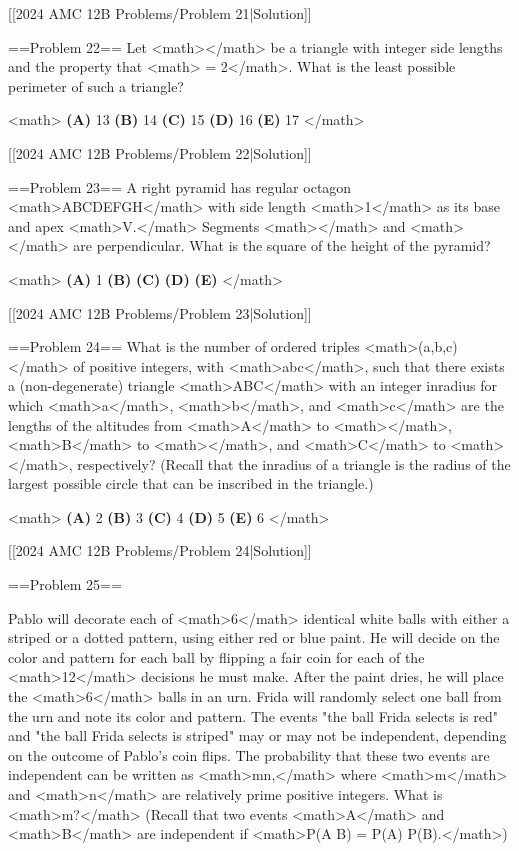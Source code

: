 [[2024 AMC 12B Problems/Problem 21|Solution]]

==Problem 22==
Let <math></math> be a triangle with integer side lengths and the property that <math> = 2</math>. What is the least possible perimeter of such a triangle?

<math>
\textbf{(A) }13 \qquad
\textbf{(B) }14 \qquad
\textbf{(C) }15 \qquad
\textbf{(D) }16 \qquad
\textbf{(E) }17 \qquad
</math>

[[2024 AMC 12B Problems/Problem 22|Solution]]

==Problem 23==
A right pyramid has regular octagon <math>ABCDEFGH</math> with side length <math>1</math> as its base and apex <math>V.</math> Segments <math></math> and <math></math> are perpendicular. What is the square of the height of the pyramid?

<math>
\textbf{(A) }1 \qquad
\textbf{(B) } \qquad
\textbf{(C) } \qquad
\textbf{(D) } \qquad
\textbf{(E) } \qquad
</math>

[[2024 AMC 12B Problems/Problem 23|Solution]]

==Problem 24==
What is the number of ordered triples <math>(a,b,c)</math> of positive integers, with <math>a\le b\le c</math>, such that there exists a (non-degenerate) triangle <math>\triangle ABC</math> with an integer inradius for which <math>a</math>, <math>b</math>, and <math>c</math> are the lengths of the altitudes from <math>A</math> to <math></math>, <math>B</math> to <math></math>, and <math>C</math> to <math></math>, respectively? (Recall that the inradius of a triangle is the radius of the largest possible circle that can be inscribed in the triangle.)

<math>
\textbf{(A) }2\qquad
\textbf{(B) }3\qquad
\textbf{(C) }4\qquad
\textbf{(D) }5\qquad
\textbf{(E) }6\qquad
</math>

[[2024 AMC 12B Problems/Problem 24|Solution]]

==Problem 25==

Pablo will decorate each of <math>6</math> identical white balls with either a striped or a dotted pattern, using either red or blue paint. He will decide on the color and pattern for each ball by flipping a fair coin for each of the <math>12</math> decisions he must make. After the paint dries, he will place the <math>6</math> balls in an urn. Frida will randomly select one ball from the urn and note its color and pattern. The events "the ball Frida selects is red" and "the ball Frida selects is striped" may or may not be independent, depending on the outcome of Pablo's coin flips. The probability that these two events are independent can be written as <math>\frac mn,</math> where <math>m</math> and <math>n</math> are relatively prime positive integers. What is <math>m?</math> (Recall that two events <math>A</math> and <math>B</math> are independent if <math>P(A B) = P(A) \cdot P(B).</math>)

